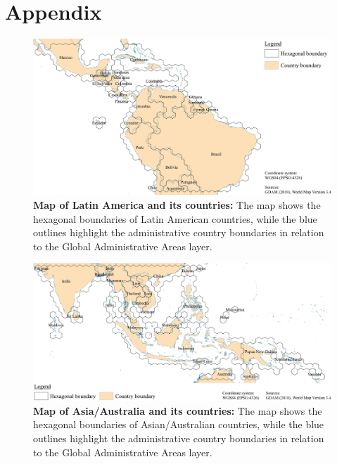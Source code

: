 \appendix
\chapter{Appendix}
\label{ch:appendix}

	\begin{figure}[ht]
		\centering
		\includegraphics[scale=1.]{img/americas_hexagonal_boundaries}
		\caption[Map of Latin America and its countries]{\textbf{Map of Latin America and its countries:} The map shows the hexagonal boundaries of Latin American countries, while the blue outlines highlight the administrative country boundaries in relation to the Global Administrative Areas layer.}
		\label{fig:americas_hexagonal_appendix}
	\end{figure}
	\begin{figure}[ht]
		\centering
		\includegraphics[scale=1.]{img/asia_hexagonal_boundaries}
		\caption[Map of Asia/Australia and its countries]{\textbf{Map of Asia/Australia and its countries:} The map shows the hexagonal boundaries of Asian/Australian countries, while the blue outlines highlight the administrative country boundaries in relation to the Global Administrative Areas layer.}
		\label{fig:asia_hexagonal_appendix}
	\end{figure}
